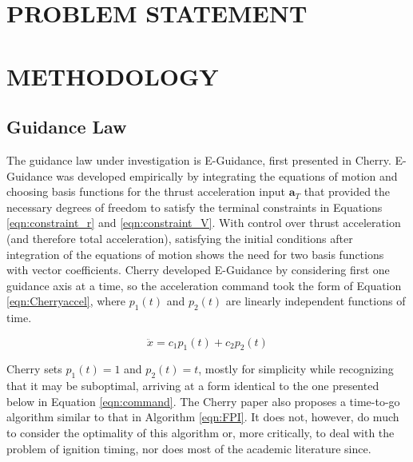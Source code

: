 \chapter{PROBLEM STATEMENT}




\chapter{METHODOLOGY}




\section{Guidance Law}
The guidance law under investigation is E-Guidance, first presented in Cherry\:\cite{CHERRY}. E-Guidance was developed empirically by integrating the equations of motion and choosing basis functions for the thrust acceleration input $\boldsymbol{a}_T$ that provided the necessary degrees of freedom to satisfy the terminal constraints in Equations \ref{eqn:constraint_r} and \ref{eqn:constraint_V}. With control over thrust acceleration (and therefore total acceleration), satisfying the initial conditions after integration of the equations of motion shows the need for two basis functions with vector coefficients. Cherry developed E-Guidance by considering first one guidance axis at a time, so the acceleration command took the form of Equation \ref{eqn:Cherryaccel}, where $p_1(t)$ and $p_2(t)$ are linearly independent functions of time.

\begin{equation}
\label{eqn:Cherryaccel}
\ddot{x} = c_1p_1(t) + c_2p_2(t)
\end{equation}

Cherry sets $p_1(t) = 1$ and $p_2(t) = t$, mostly for simplicity while recognizing that it may be suboptimal, arriving at a form identical to the one presented below in Equation \ref{eqn:command}. 
The Cherry paper also proposes a time-to-go algorithm similar to that in Algorithm \ref{eqn:FPI}. It does not, however, do much to consider the optimality of this algorithm or, more critically, to deal with the problem of ignition timing, nor does most of the academic literature since. 

